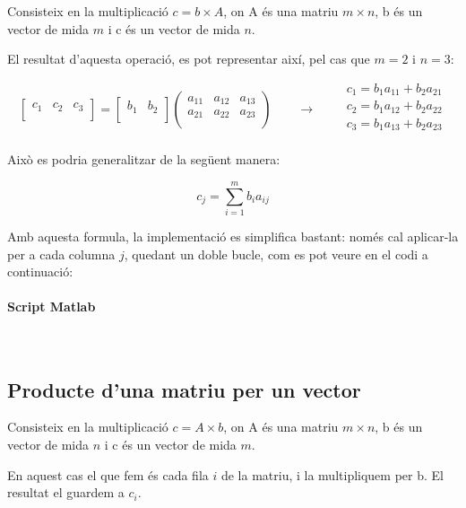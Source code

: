 \documentclass[11pt,a4paper,twoside]{report}
\begin{document}
Consisteix en la multiplicació $c = b \times A$, on A és una matriu $m \times n$, b és un vector de mida $m$ i c és un vector de mida $n$.

El resultat d'aquesta operació, es pot representar així, pel cas que $m = 2$ i $n = 3$:

 \[
 	\begin{bmatrix}
		  	c_1	&	c_2	& c_3	\\
\end{bmatrix} = 
 	\begin{bmatrix}
		  	b_1	&	b_2	\\
\end{bmatrix}
 	\begin{pmatrix}
		  	a_{11}	&	a_{12} & a_{13}\\
		  	a_{21}	&	a_{22} & a_{23}\\
\end{pmatrix}
\qquad \longrightarrow \qquad
 \begin{matrix} 
 c_1 = b_1 a_{11} + b_2 a_{21} \\
 c_2 = b_1 a_{12} + b_2 a_{22} \\
 c_3 = b_1 a_{13} + b_2 a_{23} \\
 \end{matrix}
 \]

Això es podria generalitzar de la següent manera:

\[
 c_j = \sum_{i=1}^{m} b_i a_{ij}
\]

Amb aquesta formula, la implementació es simplifica bastant: només cal aplicar-la per a cada columna $j$, quedant un doble bucle, com es pot veure en el codi a continuació:

\paragraph*{Script Matlab} \mbox{} \\



\subsection{Producte d'una matriu per un vector}
Consisteix en la multiplicació $c = A \times b$, on A és una matriu $m \times n$, b és un vector de mida $n$ i c és un vector de mida $m$.

En aquest cas el que fem és cada fila $i$ de la matriu, i la multipliquem per b. El resultat el guardem a $c_i$. \\ \\
\end{document}
